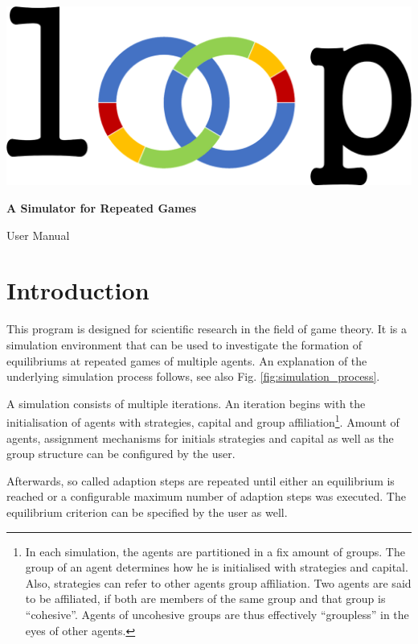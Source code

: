 \documentclass[parskip=full,11pt]{scrartcl}
\begin{document}
\begin{titlepage}
	\centering
	\vspace*{5cm}
	\includegraphics[width = 0.7\linewidth]{img/logo.png}\par
	{\huge\bfseries A Simulator for  Repeated Games\par}
	{\Large User Manual\par}
\end{titlepage}

\tableofcontents
\pagebreak

\section{Introduction}
This program is designed for scientific research in the field of game theory. It is a simulation environment that can be used to investigate the formation of equilibriums at repeated games of multiple agents. An explanation of the underlying simulation process follows, see also Fig. \ref{fig:simulation_process}.

A simulation consists of multiple iterations. An iteration begins with the initialisation of agents with strategies, capital and group affiliation\footnote{In each simulation, the agents are partitioned in a fix amount of groups. The group of an agent determines how he is initialised with strategies and capital. Also, strategies can refer to other agents group affiliation. Two agents are said to be affiliated, if both are members of the same group and that group is \enquote{cohesive}. Agents of uncohesive groups are thus effectively \enquote{groupless} in the eyes of other agents.}. Amount of agents, assignment mechanisms for initials strategies and capital as well as the group structure can be configured by the user.

Afterwards, so called adaption steps are repeated until either an equilibrium is reached or a configurable maximum number of adaption steps was executed. The equilibrium criterion can be specified by the user as well.
\end{document}
